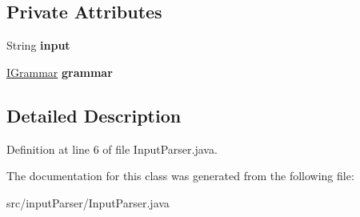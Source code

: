 \subsection*{Private Attributes}
\begin{DoxyCompactItemize}
\item 
\hypertarget{classinput_parser_1_1_input_parser_a956d0bb2dd83992416c9a53725f725a4}{String {\bfseries input}}\label{classinput_parser_1_1_input_parser_a956d0bb2dd83992416c9a53725f725a4}

\item 
\hypertarget{classinput_parser_1_1_input_parser_af4cacd2e346eaee7ee9161e12aa62e44}{\hyperlink{interfacecontext_free_1_1grammar_1_1_i_grammar}{I\-Grammar} {\bfseries grammar}}\label{classinput_parser_1_1_input_parser_af4cacd2e346eaee7ee9161e12aa62e44}

\end{DoxyCompactItemize}


\subsection{Detailed Description}


Definition at line 6 of file Input\-Parser.\-java.



The documentation for this class was generated from the following file\-:\begin{DoxyCompactItemize}
\item 
src/input\-Parser/Input\-Parser.\-java\end{DoxyCompactItemize}
